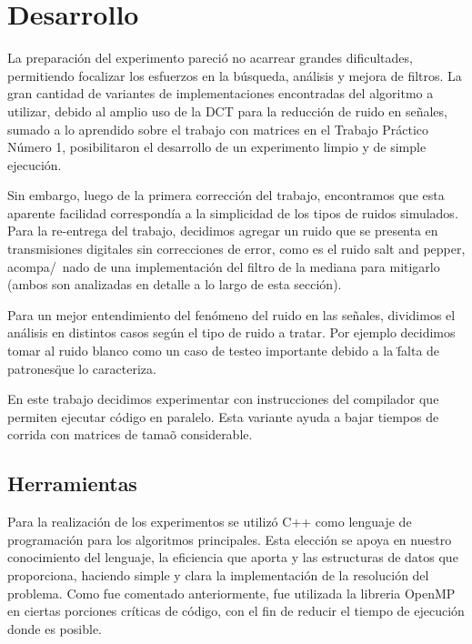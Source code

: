 
\section{Desarrollo}

La preparaci\'on del experimento pareci\'o no acarrear grandes dificultades, permitiendo
focalizar los esfuerzos en la b\'usqueda, an\'alisis y mejora de filtros. 
La gran cantidad de variantes de implementaciones encontradas del algoritmo a 
utilizar, debido al amplio uso de la DCT para la reducci\'on de ruido en se\~nales, 
sumado a lo aprendido sobre el trabajo con matrices en el Trabajo Pr\'actico 
N\'umero 1, posibilitaron el desarrollo de un experimento limpio y de simple 
ejecuci\'on.

Sin embargo, luego de la primera correcci\'on del trabajo, encontramos que esta
aparente facilidad correspond\'ia a la simplicidad de los tipos de ruidos simulados.
Para la re-entrega del trabajo, decidimos agregar un ruido que se presenta en transmisiones
digitales sin correcciones de error, como es el ruido salt and pepper, acompa/~nado de una implementaci\'on
del filtro de la mediana para mitigarlo (ambos son analizadas en detalle a lo 
largo de esta secci\'on).    	

Para un mejor entendimiento del fen\'omeno del ruido en las se\~nales, dividimos
el an\'alisis en distintos casos seg\'un el tipo de ruido a tratar. 
Por ejemplo decidimos tomar al ruido blanco como un caso de testeo importante 
debido a la \"falta de patrones\" que lo caracteriza. 

En este trabajo decidimos experimentar con instrucciones del compilador que
permiten ejecutar c\'odigo en paralelo. Esta variante ayuda a bajar tiempos de
corrida con matrices de tama\~o considerable.

\subsection{Herramientas}

Para la realizaci\'on de los experimentos se utiliz\'o C++ como lenguaje de
programaci\'on para los algoritmos principales. Esta elecci\'on se apoya en
nuestro conocimiento del lenguaje, la eficiencia que aporta y las estructuras de
datos que proporciona, haciendo simple y clara la implementaci\'on de la
resoluci\'on del problema. Como fue comentado anteriormente, fue utilizada la
libreria OpenMP en ciertas porciones cr\'iticas de c\'odigo, con el fin de 
reducir el tiempo de ejecuci\'on donde es posible.

